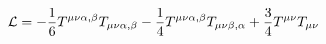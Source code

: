 \begin{equation}
{\cal L} = - \frac{1}{6} T^{\mu\nu\alpha,\beta} T_{\mu\nu\alpha,\beta}
- \frac{1}{4} T^{\mu\nu\alpha,\beta} T_{\mu\nu\beta,\alpha} +
\frac{3}{4} T^{\mu\nu} T_{\mu\nu}
\end{equation}

